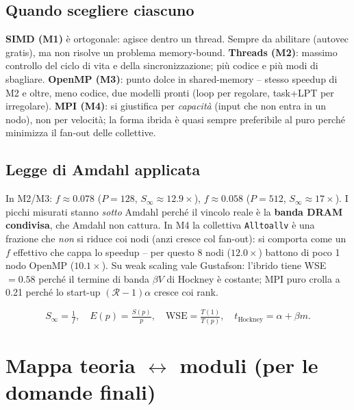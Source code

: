 \documentclass[11pt,a4paper]{article}
\begin{document}
\subsection{Quando scegliere ciascuno}

\textbf{SIMD (M1)} è ortogonale: agisce dentro un thread. Sempre da abilitare (autovec gratis), ma non risolve un problema memory-bound. \textbf{Threads (M2)}: massimo controllo del ciclo di vita e della sincronizzazione; più codice e più modi di sbagliare. \textbf{OpenMP (M3)}: punto dolce in shared-memory -- stesso speedup di M2 e oltre, meno codice, due modelli pronti (loop per regolare, task+LPT per irregolare). \textbf{MPI (M4)}: si giustifica per \emph{capacità} (input che non entra in un nodo), non per velocità; la forma ibrida è quasi sempre preferibile al puro perché minimizza il fan-out delle collettive.

\subsection{Legge di Amdahl applicata}

In M2/M3: $f\approx 0.078$ ($P{=}128$, $S_\infty\approx 12.9\times$), $f\approx 0.058$ ($P{=}512$, $S_\infty\approx 17\times$). I picchi misurati stanno \emph{sotto} Amdahl perché il vincolo reale è la \textbf{banda DRAM condivisa}, che Amdahl non cattura. In M4 la collettiva \texttt{Alltoallv} è una frazione che \emph{non} si riduce coi nodi (anzi cresce col fan-out): si comporta come un $f$ effettivo che cappa lo speedup -- per questo 8 nodi ($12.0\times$) battono di poco 1 nodo OpenMP ($10.1\times$). Su weak scaling vale Gustafson: l'ibrido tiene WSE $=0.58$ perché il termine di banda $\beta V$ di Hockney è costante; MPI puro crolla a 0.21 perché lo start-up $(\mathcal{R}-1)\alpha$ cresce coi rank.

\[ S_\infty=\tfrac{1}{f},\quad E(p)=\tfrac{S(p)}{p},\quad \text{WSE}=\tfrac{T(1)}{T(p)},\quad t_\text{Hockney}=\alpha+\beta m. \]

\section{Mappa teoria $\leftrightarrow$ moduli (per le domande finali)}
\end{document}
